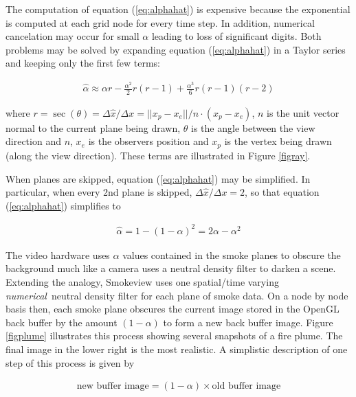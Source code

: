 The computation of equation (\ref{eq:alphahat}) is expensive because the exponential is computed at each grid node for every time step.  In addition, numerical cancelation may occur for small $\alpha$ leading to loss of significant digits. Both problems may be solved by expanding equation (\ref{eq:alphahat}) in a Taylor series and keeping only the first few terms:

\begin{eqnarray*}
\hat{\alpha}\approx \alpha r -
\frac{\alpha^2}{2}r(r-1)+\frac{\alpha^3}{6}r(r-1)(r-2)
\end{eqnarray*}

where $r=\sec(\theta)=\Delta \hat{x}/\Delta x=||x_p-x_e||/n\cdot(x_p-x_e)$, $n$ is the unit vector normal to the current plane being drawn, $\theta$ is the angle between the view direction and $n$, $x_e$ is the observers position and $x_p$ is the vertex being drawn (along the view direction).  These terms are illustrated in Figure \ref{figray}.

When planes are skipped, equation (\ref{eq:alphahat}) may be simplified.  In particular, when every 2nd plane is skipped, $\Delta\hat{x}/\Delta x=2$, so that equation (\ref{eq:alphahat})
simplifies to

\begin{eqnarray*}
\hat{\alpha}=1-(1-\alpha)^2=2\alpha-\alpha^2
\end{eqnarray*}

The video hardware uses $\alpha$ values contained in the smoke planes to obscure the background much like a camera uses a neutral density filter to darken a scene.  Extending the analogy, Smokeview uses one spatial/time varying {\em numerical}\ neutral density filter for each plane of smoke data.  On a node by node basis then, each smoke plane obscures the current image stored in  the OpenGL back buffer by the amount $(1-\alpha)$ to form a new back buffer image.  Figure \ref{figplume} illustrates this process showing several snapshots of a fire plume. The final image in the lower right is the most realistic. A simplistic description of one step of this process is given by

\begin{eqnarray*}
\mbox{new buffer image} = (1-\alpha)\times \mbox{old buffer image}
\end{eqnarray*}


